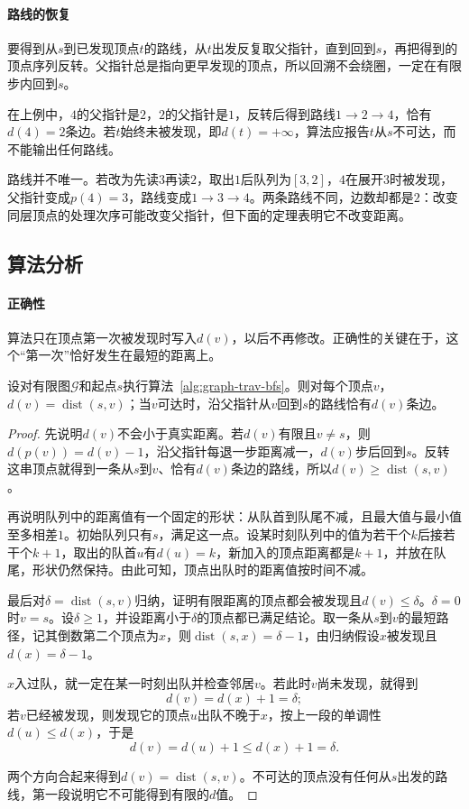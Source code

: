 \paragraph{路线的恢复}
要得到从$s$到已发现顶点$t$的路线，从$t$出发反复取父指针，直到回到$s$，再把得到的顶点序列反转。父指针总是指向更早发现的顶点，所以回溯不会绕圈，一定在有限步内回到$s$。

在上例中，$4$的父指针是$2$，$2$的父指针是$1$，反转后得到路线$1\to2\to4$，恰有$d(4)=2$条边。若$t$始终未被发现，即$d(t)=+\infty$，算法应报告$t$从$s$不可达，而不能输出任何路线。

路线并不唯一。若改为先读$3$再读$2$，取出$1$后队列为$[3,2]$，$4$在展开$3$时被发现，父指针变成$p(4)=3$，路线变成$1\to3\to4$。两条路线不同，边数却都是$2$：改变同层顶点的处理次序可能改变父指针，但下面的定理表明它不改变距离。

\subsection{算法分析}
\label{sec:graph-trav-bfs-correctness}

\paragraph{正确性}
算法只在顶点第一次被发现时写入$d(v)$，以后不再修改。正确性的关键在于，这个“第一次”恰好发生在最短的距离上。

\begin{theorem}[广度优先遍历的距离]
\label{thm:graph-trav-bfs-distance}
设对有限图$\mathcal G$和起点$s$执行算法~\ref{alg:graph-trav-bfs}。则对每个顶点$v$，$d(v)=\operatorname{dist}(s,v)$；当$v$可达时，沿父指针从$v$回到$s$的路线恰有$d(v)$条边。
\end{theorem}

\begin{proof}
先说明$d(v)$不会小于真实距离。若$d(v)$有限且$v\neq s$，则$d(p(v))=d(v)-1$，沿父指针每退一步距离减一，$d(v)$步后回到$s$。反转这串顶点就得到一条从$s$到$v$、恰有$d(v)$条边的路线，所以$d(v)\geq\operatorname{dist}(s,v)$。

再说明队列中的距离值有一个固定的形状：从队首到队尾不减，且最大值与最小值至多相差$1$。初始队列只有$s$，满足这一点。设某时刻队列中的值为若干个$k$后接若干个$k+1$，取出的队首$u$有$d(u)=k$，新加入的顶点距离都是$k+1$，并放在队尾，形状仍然保持。由此可知，顶点出队时的距离值按时间不减。

最后对$\delta=\operatorname{dist}(s,v)$归纳，证明有限距离的顶点都会被发现且$d(v)\leq\delta$。$\delta=0$时$v=s$。设$\delta\geq1$，并设距离小于$\delta$的顶点都已满足结论。取一条从$s$到$v$的最短路径，记其倒数第二个顶点为$x$，则$\operatorname{dist}(s,x)=\delta-1$，由归纳假设$x$被发现且$d(x)=\delta-1$。

$x$入过队，就一定在某一时刻出队并检查邻居$v$。若此时$v$尚未发现，就得到
\[
d(v)=d(x)+1=\delta;
\]
若$v$已经被发现，则发现它的顶点$u$出队不晚于$x$，按上一段的单调性$d(u)\leq d(x)$，于是
\[
d(v)=d(u)+1\leq d(x)+1=\delta.
\]

两个方向合起来得到$d(v)=\operatorname{dist}(s,v)$。不可达的顶点没有任何从$s$出发的路线，第一段说明它不可能得到有限的$d$值。
\end{proof}

